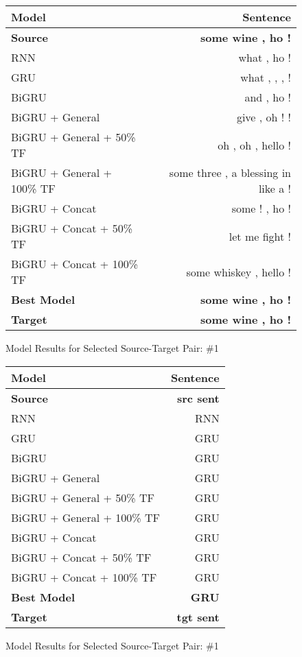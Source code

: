 \documentclass[twoside,twocolumn]{article}
\begin{document}
\begin{figure*}
    \centering
    \begin{tabular}{ |l|r| }
        \hline
        \textbf{Model}
          & \textbf{Sentence} \\
        \hline
        \textbf{Source} & \textbf{some wine , ho !} \\ \hline
        RNN & what , ho ! \\ \hline
        GRU & what , , , ! \\ \hline
        BiGRU & and , ho ! \\ \hline
        BiGRU + General & give , oh ! ! \\ \hline
        BiGRU + General + 50\% TF & oh , oh , hello ! \\ \hline
        BiGRU + General + 100\% TF & some three , a blessing in like a ! \\ \hline
        BiGRU + Concat & some ! , ho ! \\ \hline
        BiGRU + Concat + 50\% TF & let me fight ! \\ \hline
        BiGRU + Concat + 100\% TF & some whiskey , hello ! \\ \hline
        \textbf{Best Model} & \textbf{some wine , ho !} \\ \hline
        \textbf{Target} & \textbf{some wine , ho !} \\ \hline
    \end{tabular}

    \caption{Model Results for Selected Source-Target Pair: \#1}
    \label{fig:model-results}
\end{figure*}

\begin{figure*}
    \centering
    \begin{tabular}{ |l|r| }
        \hline
        \textbf{Model}
          & \textbf{Sentence} \\
        \hline
        \textbf{Source} & \textbf{src sent} \\ \hline
        RNN & RNN \\ \hline
        GRU & GRU \\ \hline
        BiGRU & GRU \\ \hline
        BiGRU + General & GRU \\ \hline
        BiGRU + General + 50\% TF & GRU \\ \hline
        BiGRU + General + 100\% TF & GRU \\ \hline
        BiGRU + Concat & GRU \\ \hline
        BiGRU + Concat + 50\% TF & GRU \\ \hline
        BiGRU + Concat + 100\% TF & GRU \\ \hline
        \textbf{Best Model} & \textbf{GRU} \\ \hline
        \textbf{Target} & \textbf{tgt sent} \\ \hline
    \end{tabular}

    \caption{Model Results for Selected Source-Target Pair: \#1}
    \label{fig:model-results}
\end{figure*}
\end{document}
